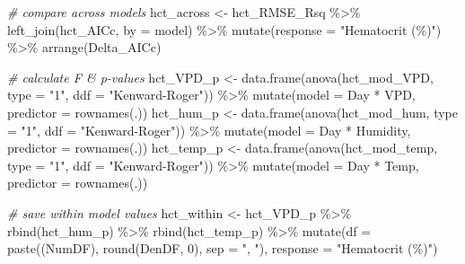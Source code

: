 \documentclass[
]{article}
\newenvironment{Shaded}{\begin{snugshade}}{\end{snugshade}}
\newcommand{\AttributeTok}[1]{\textcolor[rgb]{0.77,0.63,0.00}{#1}}
\newcommand{\CommentTok}[1]{\textcolor[rgb]{0.56,0.35,0.01}{\textit{#1}}}
\newcommand{\DecValTok}[1]{\textcolor[rgb]{0.00,0.00,0.81}{#1}}
\newcommand{\FunctionTok}[1]{\textcolor[rgb]{0.00,0.00,0.00}{#1}}
\newcommand{\NormalTok}[1]{#1}
\newcommand{\OtherTok}[1]{\textcolor[rgb]{0.56,0.35,0.01}{#1}}
\newcommand{\SpecialCharTok}[1]{\textcolor[rgb]{0.00,0.00,0.00}{#1}}
\newcommand{\StringTok}[1]{\textcolor[rgb]{0.31,0.60,0.02}{#1}}
\begin{document}
\begin{Shaded}
\begin{Highlighting}[]
\CommentTok{\# compare across models}
\NormalTok{hct\_across }\OtherTok{\textless{}{-}}\NormalTok{ hct\_RMSE\_Rsq }\SpecialCharTok{\%\textgreater{}\%}
  \FunctionTok{left\_join}\NormalTok{(hct\_AICc, }\AttributeTok{by =} \StringTok{\textquotesingle{}model\textquotesingle{}}\NormalTok{) }\SpecialCharTok{\%\textgreater{}\%}
  \FunctionTok{mutate}\NormalTok{(}\AttributeTok{response =} \StringTok{"Hematocrit (\%)"}\NormalTok{) }\SpecialCharTok{\%\textgreater{}\%}
  \FunctionTok{arrange}\NormalTok{(Delta\_AICc)}

\CommentTok{\# calculate F \& p{-}values}
\NormalTok{hct\_VPD\_p }\OtherTok{\textless{}{-}} \FunctionTok{data.frame}\NormalTok{(}\FunctionTok{anova}\NormalTok{(hct\_mod\_VPD, }
                              \AttributeTok{type =} \StringTok{"1"}\NormalTok{, }
                              \AttributeTok{ddf =} \StringTok{"Kenward{-}Roger"}\NormalTok{)) }\SpecialCharTok{\%\textgreater{}\%}
  \FunctionTok{mutate}\NormalTok{(}\AttributeTok{model =} \StringTok{\textquotesingle{}Day * VPD\textquotesingle{}}\NormalTok{,}
         \AttributeTok{predictor =} \FunctionTok{rownames}\NormalTok{(.))}
\NormalTok{hct\_hum\_p }\OtherTok{\textless{}{-}} \FunctionTok{data.frame}\NormalTok{(}\FunctionTok{anova}\NormalTok{(hct\_mod\_hum, }
                              \AttributeTok{type =} \StringTok{"1"}\NormalTok{, }
                              \AttributeTok{ddf =} \StringTok{"Kenward{-}Roger"}\NormalTok{)) }\SpecialCharTok{\%\textgreater{}\%}
  \FunctionTok{mutate}\NormalTok{(}\AttributeTok{model =} \StringTok{\textquotesingle{}Day * Humidity\textquotesingle{}}\NormalTok{,}
         \AttributeTok{predictor =} \FunctionTok{rownames}\NormalTok{(.))}
\NormalTok{hct\_temp\_p }\OtherTok{\textless{}{-}} \FunctionTok{data.frame}\NormalTok{(}\FunctionTok{anova}\NormalTok{(hct\_mod\_temp, }
                              \AttributeTok{type =} \StringTok{"1"}\NormalTok{, }
                              \AttributeTok{ddf =} \StringTok{"Kenward{-}Roger"}\NormalTok{)) }\SpecialCharTok{\%\textgreater{}\%}
  \FunctionTok{mutate}\NormalTok{(}\AttributeTok{model =} \StringTok{\textquotesingle{}Day * Temp\textquotesingle{}}\NormalTok{,}
         \AttributeTok{predictor =} \FunctionTok{rownames}\NormalTok{(.))}

\CommentTok{\# save within model values}
\NormalTok{hct\_within }\OtherTok{\textless{}{-}}\NormalTok{ hct\_VPD\_p }\SpecialCharTok{\%\textgreater{}\%}
  \FunctionTok{rbind}\NormalTok{(hct\_hum\_p) }\SpecialCharTok{\%\textgreater{}\%}
  \FunctionTok{rbind}\NormalTok{(hct\_temp\_p) }\SpecialCharTok{\%\textgreater{}\%}
  \FunctionTok{mutate}\NormalTok{(}\AttributeTok{df =} \FunctionTok{paste}\NormalTok{((NumDF), }\FunctionTok{round}\NormalTok{(DenDF, }\DecValTok{0}\NormalTok{), }\AttributeTok{sep =} \StringTok{", "}\NormalTok{),}
         \AttributeTok{response =} \StringTok{"Hematocrit (\%)"}\NormalTok{)}
\end{Highlighting}
\end{Shaded}
\end{document}
